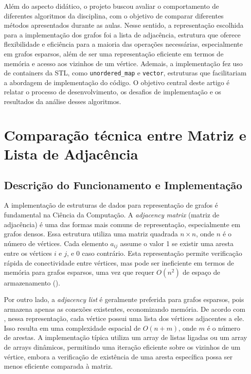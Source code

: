 \documentclass{sbc2023}%
\begin{document}
Além do aspecto didático, o projeto buscou avaliar o comportamento de diferentes algoritmos da disciplina, com o objetivo de comparar diferentes métodos apresentados durante as aulas. Nesse sentido, a representação escolhida para a implementação dos grafos foi a lista de adjacência, estrutura que oferece flexibilidade e eficiência para a maioria das operações necessárias, especialmente em grafos esparsos, além de ser uma representação eficiente em termos de memória e acesso aos vizinhos de um vértice. Ademais, a implementação fez uso de containers da STL, como \texttt{unordered\_map} e \texttt{vector}, estruturas que facilitariam a abordagem de implementação do código. O objetivo central deste artigo é relatar o processo de desenvolvimento, os desafios de implementação e os resultados da análise desses algoritmos.


\section{Comparação técnica entre Matriz e Lista de Adjacência}

\subsection{Descrição do Funcionamento e Implementação}

A implementação de estruturas de dados para representação de grafos é fundamental na Ciência da Computação. A \textit{adjacency matrix} (matriz de adjacência) é uma das formas mais comuns de representação, especialmente em grafos densos. Essa estrutura utiliza uma matriz quadrada \( n \times n \), onde \( n \) é o número de vértices. Cada elemento \( a_{ij} \) assume o valor 1 se existir uma aresta entre os vértices \( i \) e \( j \), e 0 caso contrário. Esta representação permite verificação rápida de conectividade entre vértices, mas pode ser ineficiente em termos de memória para grafos esparsos, uma vez que requer \( O(n^2) \) de espaço de armazenamento (\cite{metodos_de_implementacao}).

Por outro lado, a \textit{adjacency list} é geralmente preferida para grafos esparsos, pois armazena apenas as conexões existentes, economizando memória. De acordo com \cite{metodos_de_implementacao}, nessa representação, cada vértice possui uma lista dos vértices adjacentes a ele. Isso resulta em uma complexidade espacial de \( O(n + m) \), onde \( m \) é o número de arestas. A implementação típica utiliza um array de listas ligadas ou um array de arrays dinâmicos, permitindo uma iteração eficiente sobre os vizinhos de um vértice, embora a verificação de existência de uma aresta específica possa ser menos eficiente comparada à matriz.
\end{document}
